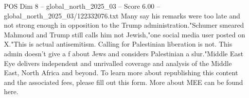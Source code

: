 \begin{textsample}{POS Dim 8 – global\_north\_2025\_03 – Score 6.00 – global\_north\_2025\_03/122332076.txt}
Many say his remarks were too late and not strong enough in opposition to the Trump administration."Schumer smeared Mahmoud and Trump still calls him not Jewish,"one social media user posted on X."This is actual antisemitism.
Calling for Palestinian liberation is not.
This admin doesn't give a f about Jews and considers Palestinian a slur."Middle East Eye delivers independent and unrivalled coverage and analysis of the Middle East, North Africa and beyond.
To learn more about republishing this content and the associated fees, please fill out this form.
More about MEE can be found here.

\end{textsample}
